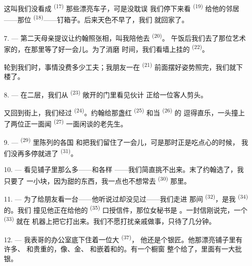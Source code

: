 这叫我们没看成 \textsuperscript{(17)} 那些漂亮车子，可是没耽误
我们停下来看 \textsuperscript{(19)} 给他的邻居——那位
 \textsuperscript{(18)}——钉箱子。后来天色不早了，我们
就回家了。

\VUsaut{3.0mm}

7. --- 第二天母亲提议让约翰照张相，叫我陪他去 \textsuperscript{(20)}。
午饭后我们去了那位艺术家的，在那里等了好一会儿。为了消磨
时间，我们看墙上挂的 \textsuperscript{(22)}。

轮到我们时，事情没费多少工夫；我朋友一在 \textsuperscript{(21)}
前面摆好姿势照完，我们就下楼了。

8. --- 在二层，我们从 \textsuperscript{(23)} 敞开的门里看见伙计
正给一位客人剪头。

又回到街上，我们经过 \textsuperscript{(24)}。约翰给那盏红
 \textsuperscript{(25)} 和当 \textsuperscript{(26)} 的
逗得直乐，一头撞上了两位正一面闻 \textsuperscript{(27)}
一面闲谈的老先生。

\VUsaut{3.0mm}

9. ---  \textsuperscript{(29)} 里陈列的各国
和把我们留住了一会儿，可是那时正是吃点心的时候，
我们没再多停就进了 \textsuperscript{(31)}。

10. --- 看见铺子里那么多——和各样
——我们简直挑不出来。末了约翰选了，我只要了
一小块，因为甜的东西，我一点也不想常去
 \textsuperscript{(30)} 那里。

\VUsaut{3.0mm}

11. --- 为了给朋友看一台——他听说过却没见过——我们走进
那间 \textsuperscript{(32)}，是我
\textsuperscript{(34)} 的。我们
撞见他正在给他的 \textsuperscript{(35)} 口授信件，那位女秘书是
。一封信刚说完，一个 \textsuperscript{(33)} 就在
机器上把它打出来。我们不愿打扰亲戚做事，只待了几分钟。

12. --- 我表哥的办公室底下住着一位大 \textsuperscript{(37)}，
他还是个银匠。他那漂亮铺子里有许多、
和贵重的，像、金、
和嵌着和的。有一个橱窗
整个给了，里面有一大批银。

